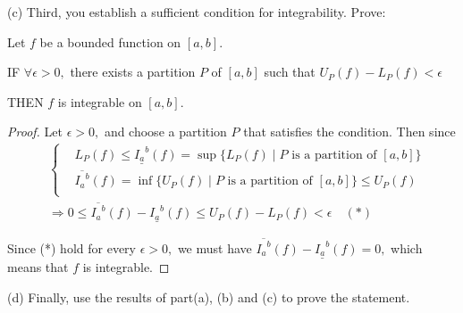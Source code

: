 \documentclass{article}
\begin{document}
\begin{problem*}[3c]
    (c) Third, you establish a sufficient condition for integrability. Prove:

    Let $f$ be a bounded function on $[a, b].$

    IF $\forall \epsilon > 0,$ there exists a partition $P$ of $[a,b]$ such that $U_P(f) - L_P(f) < \epsilon$

    THEN $f$ is integrable on $[a, b].$
\end{problem*}

\begin{proof}
    Let $\epsilon > 0,$ and choose a partition $P$ that satisfies the condition. 
    Then since
    \[
        \begin{aligned}
            &\begin{cases}
                &L_P(f) \le \underline{{I_a}^b}(f) = \sup \{ L_P(f) \mid P \text{\ is a partition of\ } [a, b]\}\\
                &\overline{{I_a}^b}(f) = \inf\{U_P(f) \mid P \text{\ is a partition of\ } [a, b]\} \le U_P(f)\\
            \end{cases}\\
            &\Rightarrow 0 \le \overline{{I_a}^b}(f)  - \underline{{I_a}^b}(f) \le U_P(f) - L_P(f) < \epsilon \quad (*)
        \end{aligned}
    \]

    Since (*) hold for every $\epsilon >0,$ we must have $\overline{{I_a}^b}(f)  - \underline{{I_a}^b}(f) = 0,$
    which means that $f$ is integrable.
\end{proof}

\begin{problem*}[3d]
    (d) Finally, use the results of part(a), (b) and (c) to prove the statement.
\end{problem*}
\end{document}
